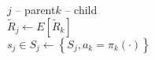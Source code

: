\begin{minipage}{\textwidth}

\begin{minipage}{0.4\textwidth}
$j$ -- parent\quad $k$ -- child\\
$\tilde{R}_j\leftarrow E[\tilde{R}_k]$\\
$s_j\in S_j \leftarrow \left\{S_j, a_k=\pi_k(\cdot)\right\}$\\

\end{minipage}
\end{minipage}


